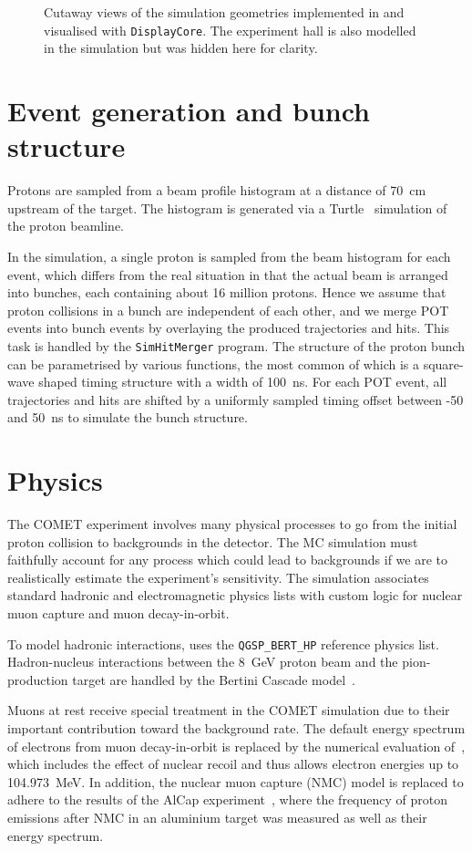\begin{figure}
    \caption{Cutaway views of the simulation geometries implemented in \SimG and visualised with \texttt{DisplayCore}. The experiment hall is also modelled in the simulation but was hidden here for clarity.}
    \label{fig:comet_geometries}
\end{figure}

\section{Event generation and bunch structure}
Protons are sampled from a beam profile histogram at a distance of \SI{70}{\cm} upstream of the target. The histogram is generated via a Turtle~\cite{Carey1974DecayT} simulation of the proton beamline.

In the simulation, a single proton is sampled from the beam histogram for each event, which differs from the real situation in that the actual beam is arranged into bunches, each containing about 16 million protons. Hence we assume that proton collisions in a bunch are independent of each other, and we merge POT events into bunch events by overlaying the produced trajectories and hits. This task is handled by the \texttt{SimHitMerger} program. The structure of the proton bunch can be parametrised by various functions, the most common of which is a square-wave shaped timing structure with a width of \SI{100}{\ns}. For each POT event, all trajectories and hits are shifted by a uniformly sampled timing offset between -50 and \SI{50}{\ns} to simulate the bunch structure. 

\section{Physics}
The COMET experiment involves many physical processes to go from the initial proton collision to backgrounds in the detector.
The MC simulation must faithfully account for any process which could lead to backgrounds if we are to realistically estimate the experiment's sensitivity. The \SimG simulation associates standard \Geant hadronic and electromagnetic physics lists with custom logic for nuclear muon capture and muon decay-in-orbit.

To model hadronic interactions, \SimG uses the \texttt{QGSP\_BERT\_HP} reference physics list. Hadron-nucleus interactions between the \SI{8}{\GeV} proton beam and the pion-production target are handled by the Bertini Cascade model~\cite{WRIGHT2015175}.

Muons at rest receive special treatment in the COMET simulation due to their important contribution toward the background rate. The default energy spectrum of electrons from muon decay-in-orbit is replaced by the numerical evaluation of~\cite{czarnecki}, which includes the effect of nuclear recoil and thus allows electron energies up to \SI{104.973}{\MeV}. In addition, the nuclear muon capture (NMC) model is replaced to adhere to the results of the AlCap experiment~\cite{litchfield2015status}, where the frequency of proton emissions after NMC in an aluminium target was measured as well as their energy spectrum.


